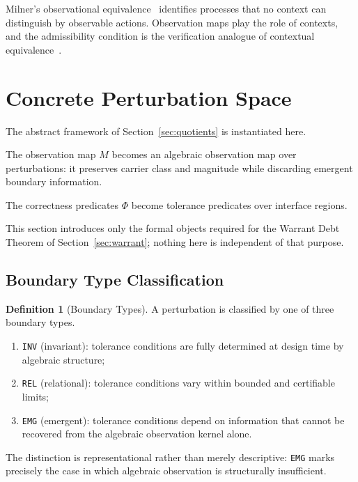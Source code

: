 \documentclass[12pt]{article}
\theoremstyle{plain}
\theoremstyle{definition}
\newtheorem{definition}[theorem]{Definition}
\theoremstyle{remark}
\begin{document}
Milner's observational equivalence~\cite{milner1980,milner1989}
identifies processes that no context can distinguish by observable
actions.
Observation maps play the role of contexts, and the admissibility
condition is the verification analogue of contextual
equivalence~\cite{sangiorgi2011}.

\section{Concrete Perturbation Space}
\label{sec:perturbations}

The abstract framework of Section~\ref{sec:quotients} is instantiated
here.

The observation map $M$ becomes an algebraic observation map over
perturbations: it preserves carrier class and magnitude while
discarding emergent boundary information.

The correctness predicates $\Phi$ become tolerance predicates over
interface regions.

This section introduces only the formal objects required for the
Warrant Debt Theorem of Section~\ref{sec:warrant}; nothing here is
independent of that purpose.

\subsection{Boundary Type Classification}

\begin{definition}[Boundary Types]

A perturbation is classified by one of three boundary types.

\begin{enumerate}[label=(\roman*),noitemsep]
    \item \texttt{INV} (invariant):
    tolerance conditions are fully determined at design time by
    algebraic structure;

    \item \texttt{REL} (relational):
    tolerance conditions vary within bounded and certifiable limits;

    \item \texttt{EMG} (emergent):
    tolerance conditions depend on information that cannot be
    recovered from the algebraic observation kernel alone.
\end{enumerate}

The distinction is representational rather than merely descriptive:
\texttt{EMG} marks precisely the case in which algebraic observation
is structurally insufficient.

\end{definition}
\end{document}
